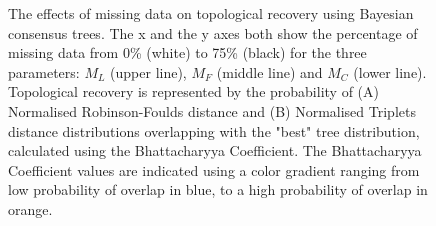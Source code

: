 \documentclass[12pt,letterpaper]{article}
\begin{document}
\begin{figure}
\caption{The effects of missing data on topological recovery using Bayesian consensus trees. The x and the y axes both show the percentage of missing data from 0\% (white) to 75\% (black) for the three parameters: $M_{L}$ (upper line), $M_{F}$ (middle line) and $M_{C}$ (lower line). Topological recovery is represented by the probability of (A) Normalised Robinson-Foulds distance and (B) Normalised Triplets distance distributions overlapping with the "best" tree distribution, calculated using the Bhattacharyya Coefficient. The Bhattacharyya Coefficient values are indicated using a color gradient ranging from low probability of overlap in blue, to a high probability of overlap in orange.
}
\label{Fig_Results-paircomp_within}
\end{figure}


\setcounter{figure}{0} \renewcommand{\thefigure}{\arabic{figure}}
\end{document}
